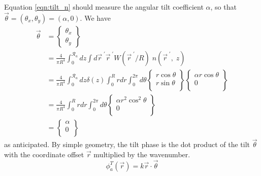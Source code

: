 Equation \ref{eqn:tilt_n} should measure the
angular tilt coefficient $\alpha$, so that $\vec{\theta} =
\left(\theta_{x}, \theta_{y}\right) = \left(\alpha, 0\right)$.  We
have
\begin{equation}
\begin{aligned}
\vec{\theta} & = 
\left\{
\begin{array}{c}
\theta_{x} \\
\theta_{y} 
\end{array} 
\right\}\\
& = 
\frac{4}{\pi R^{4}} \int_{0}^{\mathcal{R}_{a}} dz 
\int d\vec{r}^{\;\prime} \vec{r}^{\;\prime} W(\vec{r}^{\;\prime}/R) \;
n(\vec{r}^{\;\prime}, \;z) \\
& = 
\frac{4}{\pi R^{4}} \int_{0}^{\mathcal{R}_{a}} dz \delta\left(z\right)
\int_{0}^{R} r dr \int_{0}^{2\pi} d\theta 
\left\{
\begin{array}{c}
r \cos \theta \\
r \sin \theta \\ 
\end{array}
\right\}
\left\{
\begin{array}{c}
\alpha r \cos \theta \\
0 \\ 
\end{array}
\right\} \\
& = 
\frac{4}{\pi R^{4}}  
\int_{0}^{R} r dr \int_{0}^{2\pi} d\theta 
\left\{
\begin{array}{c}
\alpha r^{2} \cos^{2} \theta \\
0 \\ 
\end{array}
\right\}\\
& = 
\left\{
\begin{array}{c}
\alpha \\
0 \\ 
\end{array}
\right\}
\end{aligned}
\end{equation}
as anticipated.  By simple geometry, the tilt phase is the dot product
of the tilt $\vec{\theta}$ with the coordinate offset
$\vec{r}$ multiplied by the wavenumber.
\begin{equation}\label{eqn:tiltphase_n}
\phi^{T}_{a}\left(\vec{r}\right) = k \vec{r}  \cdot \vec{\theta} 
\end{equation}

